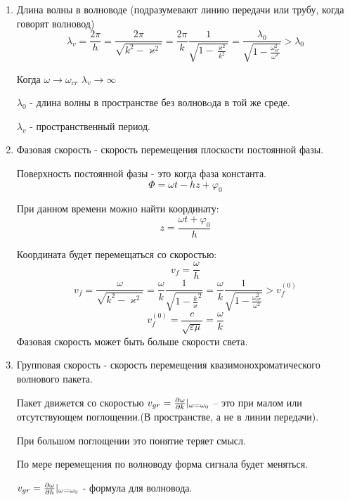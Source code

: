 \documentclass[a4paper,14pt]{extarticle}
\renewcommand{\phi}{\varphi}
\renewcommand{\kappa}{\varkappa}
\begin{document}
\begin{enumerate}
	
	\item Длина волны в волноводе (подразумевают линию передачи или трубу, когда говорят волновод)
	\begin{equation*}
	\lambda_v = \frac{2 \pi}{h} = \frac{2 \pi}{\sqrt{k^2 - \kappa^2}} = \frac{2 \pi}{k} \frac{1}{\sqrt{1 - \frac{\kappa^2}{k^2}}} = \frac{\lambda_0}{\sqrt{1 - \frac{\omega_{cr}^2}{\omega^2}}} > \lambda_0
	\end{equation*}
	
	Когда $\omega \rightarrow \omega_{cr}$	$\lambda_{v} \rightarrow \infty$
	
	$\lambda_0$ - длина волны в пространстве без волновoда в той же среде.
	
	$\lambda_{v}$ - пространственный период.
	
	\item Фазовая скорость - скорость перемещения плоскости постоянной фазы.
	
	Поверхность постоянной фазы - это когда фаза константа.
	\begin{equation*}
	\Phi = \omega t - h z + \phi_0
	\end{equation*}
	
	При данном времени можно найти координату:
	\begin{equation*}
	z = \frac{\omega t  + \phi_0}{ h }
	\end{equation*}
	
	Координата будет перемещаться со скоростью:
	\begin{equation*}
	v_f = \frac{\omega}{h}
	\end{equation*}
	\begin{equation*}
	v_f = 
	\frac{\omega}{\sqrt{k^2 - \kappa^2}} = 
	\frac{\omega}{k} \frac{1}{\sqrt{1 - {\frac{k}{\kappa}^2}}} = \frac{\omega}{k} \frac{1}{\sqrt{1 - {\frac{\omega_{cr}^2}{\omega^2}}}} > v_f^{(0)}
	\end{equation*}
	\begin{equation*}
	v_f^{(0)} = \frac{c}{\sqrt{\varepsilon \mu}} = \frac{\omega}{k}
	\end{equation*}
	Фазовая скорость может быть больше скорости света.
	
	\item Групповая скорость - скорость перемещения квазимонохроматического волнового пакета. 	
	
	
	
	Пакет движется со скоростью $ v_{gr} = \pdv{\omega}{k}\vert_{\omega = \omega_{0}} $ -- это при малом или отсутствующем поглощении.(В пространстве, а не в линии передачи).
	
	При большом поглощении это понятие теряет смысл.
	
	По мере перемещения по волноводу форма сигнала будет меняться.
	
	$v_{gr} = \pdv{\omega}{h}\vert_{\omega = \omega_{0}} $ - формула для волновода. 
	
\end{enumerate}
\end{document}
